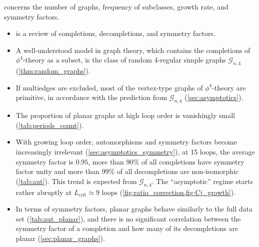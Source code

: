 \documentclass[11pt,a4paper]{article}
\renewcommand{\|}{\rule[-0.4ex]{0.2ex}{1.2em}}
\begin{document}
\noindent
{} concerns the number of graphs, frequency of subclasses, growth rate, and symmetry factors.
\begin{itemize}
	\item {} is a review of  completions, decompletions, and symmetry factors. 
	\item A well-understood model in graph theory, which contains the completions of $\phi^4$-theory as a subset, is the class of random 4-regular simple graphs $\mathcal{G}_{n,4}$  (\cref{thm:random_graphs}).
	\item If multiedges are excluded, most of the vertex-type graphs of $\phi^4$-theory are primitive, in accordance with the prediction from $\mathcal{G}_{n,4}$ (\cref{sec:asymptotics}).
	\item The proportion of planar graphs at high loop order is vanishingly small (\cref{tab:periods_count}).
	\item With growing loop order, automorphisms and symmetry factors become increasingly irrelevant (\cref{sec:asymptotics_symmetry}), at 15 loops, the average symmetry factor is $0.95$, more than 90\% of all completions have symmetry factor unity and more than 99\% of all decompletions are non-isomorphic (\cref{tab:aut}). This trend is expected from   $\mathcal{G}_{n,4}$. The \enquote{asymptotic} regime starts rather abruptly at $L_\text{crit}\approx 9$ loops (\cref{fig:ratio_correction,fig:Cj_growth}).
	\item In terms of symmetry factors, planar graphs behave similarly to the full data set (\cref{tab:aut_planar}), and there is no significant correlation between the symmetry factor of a completion and how many of its decompletions are planar (\cref{sec:planar_graphs}). 
\end{itemize}
	
\end{document}
